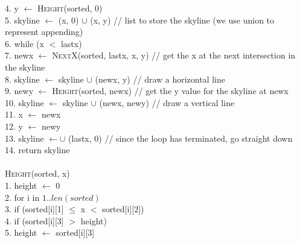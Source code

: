 \documentclass{article}
\begin{document}
\begin{enumerate}
\begin{algorithm}
        4. \hspace{0em} y $\leftarrow$ \textsc{Height}(sorted, 0) \\
        5. \hspace{0em} skyline $\leftarrow$ (x, 0) $\cup$ (x, y) \hspace{2em} // list to store the skyline (we use union to represent appending) \\
        6. \hspace{0em} while (x $<$ lastx) \\
        7. \hspace{2em} newx $\leftarrow$ \textsc{NextX}(sorted, lastx, x, y) \hspace{2em} // get the x at the next intersection in the skyline \\
        8. \hspace{2em} skyline $\leftarrow$ skyline $\cup$ (newx, y) \hspace{2em} // draw a horizontal line \\
        9. \hspace{2em} newy $\leftarrow$ \textsc{Height}(sorted, newx) \hspace{2em} // get the y value for the skyline at newx \\
        10. \hspace{1.5em} skyline $\leftarrow$ skyline $\cup$ (newx, newy) \hspace{2em} // draw a vertical line \\
        11. \hspace{1.5em} x $\leftarrow$ newx \\
        12. \hspace{1.5em} y $\leftarrow$ newy \\
        13. skyline $\leftarrow \cup$ (lastx, 0) // since the loop has terminated, go straight down \\
        14. return skyline \\\\

        \textsc{Height}(sorted, x) \\
        1. \hspace{0em} height $\leftarrow$ 0 \\
        2. \hspace{0em} for i in $1..len(sorted)$ \\
        3. \hspace{2em}     if (sorted[i][1] $\leq$ x $<$ sorted[i][2]) \\
        4. \hspace{4em}         if (sorted[i][3] $>$ height) \\
        5. \hspace{6em}             height $\leftarrow$ sorted[i][3] \\\\


\end{algorithm}
\end{enumerate}
\end{document}
